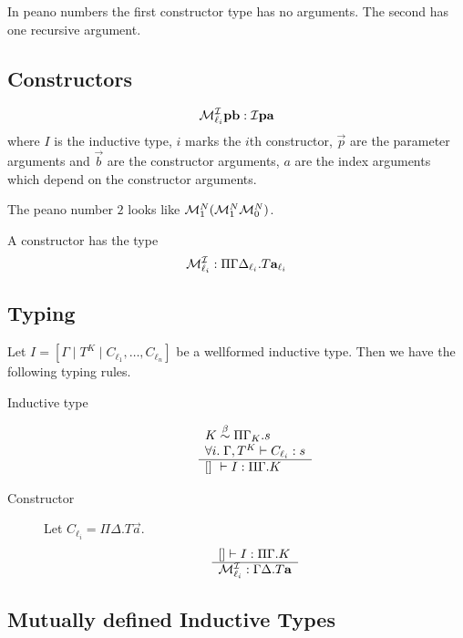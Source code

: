 In peano numbers the first constructor type has no arguments. The second has one
recursive argument.




\subsection{Constructors}

$$
    {\cal M}^{\cal I}_{\ell_i} {\mathbf p} {\mathbf b}: {\cal I} {\mathbf p} {\mathbf a}
$$
where $I$ is the inductive type, $i$ marks the $i$th constructor, $\vec p$ are
the parameter arguments and $\vec b$ are the constructor arguments, $a$ are the
index arguments which depend on the constructor arguments.

The peano number $2$ looks like $ {\cal M}^N_1 ({\cal M}^N_1 {\cal M}^N_0) $.

A constructor has the type
$$
    {\cal M}^{\cal I}_{\ell_i} : \Pi \Gamma \Delta_{\ell_i}. T {{\mathbf a}}_{\ell_i}
$$





\subsection{Typing}

Let $I = [\Gamma \mid T^K \mid C_{\ell_1}, \ldots, C_{\ell_n}]$ be a wellformed
inductive type. Then we have the following typing rules.

\begin{description}

    \item [Inductive type]
        $$
            \rulev{
                K \; \betaeq\; \Pi \Gamma_K. s
                \\
                \forall i.\; \Gamma, T^K \vdash C_{\ell_i}: s
            }
            {
                [] \vdash I : \Pi \Gamma. K
            }
        $$


    \item [Constructor] Let $C_{\ell_i} = \Pi \Delta. T \vec a$.
        $$
        \begin{array}{l} 
            [] \vdash I: \Pi \Gamma. K
         \\ \hline 
            {\cal M}^{\cal I}_{\ell_i}: \Gamma \Delta.T {\mathbf a}
         \end{array}
        $$
\end{description}






\subsection{Mutually defined Inductive Types}

